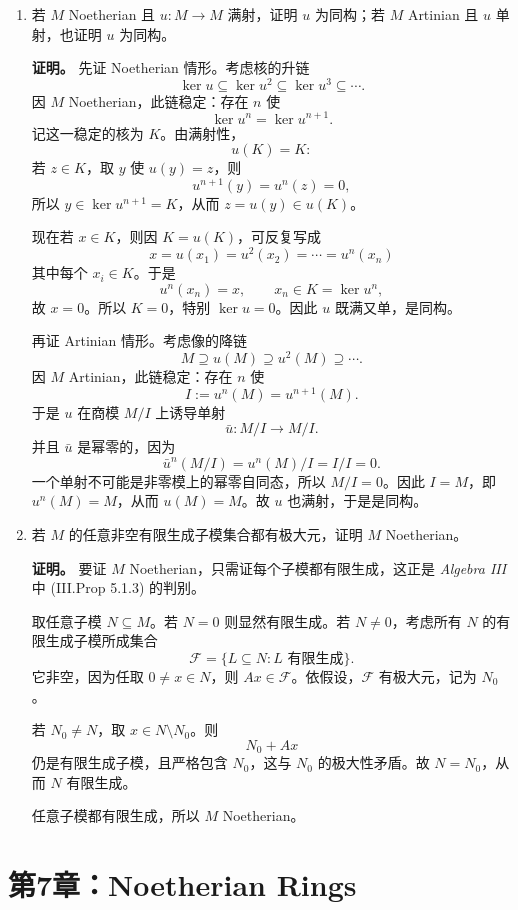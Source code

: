 \documentclass[a4paper]{ctexart}
\begin{document}
\begin{enumerate}[leftmargin=*, label=\textbf{6.\arabic*.}]
\item 若 \(M\) Noetherian 且 \(u:M\to M\) 满射，证明 \(u\) 为同构；若 \(M\) Artinian 且 \(u\) 单射，也证明 \(u\) 为同构。

\textbf{证明。}
先证 Noetherian 情形。考虑核的升链
\[
\ker u\subseteq \ker u^2\subseteq \ker u^3\subseteq \cdots.
\]
因 \(M\) Noetherian，此链稳定：存在 \(n\) 使
\[
\ker u^n=\ker u^{n+1}.
\]
记这一稳定的核为 \(K\)。由满射性，
\[
u(K)=K:
\]
若 \(z\in K\)，取 \(y\) 使 \(u(y)=z\)，则
\[
u^{n+1}(y)=u^n(z)=0,
\]
所以 \(y\in \ker u^{n+1}=K\)，从而 \(z=u(y)\in u(K)\)。

现在若 \(x\in K\)，则因 \(K=u(K)\)，可反复写成
\[
x=u(x_1)=u^2(x_2)=\cdots=u^n(x_n)
\]
其中每个 \(x_i\in K\)。于是
\[
u^n(x_n)=x,\qquad x_n\in K=\ker u^n,
\]
故 \(x=0\)。所以 \(K=0\)，特别 \(\ker u=0\)。因此 \(u\) 既满又单，是同构。

再证 Artinian 情形。考虑像的降链
\[
M\supseteq u(M)\supseteq u^2(M)\supseteq \cdots.
\]
因 \(M\) Artinian，此链稳定：存在 \(n\) 使
\[
I:=u^n(M)=u^{n+1}(M).
\]
于是 \(u\) 在商模 \(M/I\) 上诱导单射
\[
\bar u:M/I\to M/I.
\]
并且 \(\bar u\) 是幂零的，因为
\[
\bar u^n(M/I)=u^n(M)/I=I/I=0.
\]
一个单射不可能是非零模上的幂零自同态，所以 \(M/I=0\)。因此 \(I=M\)，即 \(u^n(M)=M\)，从而 \(u(M)=M\)。故 \(u\) 也满射，于是是同构。

\item 若 \(M\) 的任意非空有限生成子模集合都有极大元，证明 \(M\) Noetherian。

\textbf{证明。}
要证 \(M\) Noetherian，只需证每个子模都有限生成，这正是 \textit{Algebra III} 中 (III.Prop 5.1.3) 的判别。

取任意子模 \(N\subseteq M\)。若 \(N=0\) 则显然有限生成。若 \(N\neq 0\)，考虑所有 \(N\) 的有限生成子模所成集合
\[
\mathcal F=\{L\subseteq N: L \text{ 有限生成}\}.
\]
它非空，因为任取 \(0\neq x\in N\)，则 \(Ax\in\mathcal F\)。依假设，\(\mathcal F\) 有极大元，记为 \(N_0\)。

若 \(N_0\neq N\)，取 \(x\in N\setminus N_0\)。则
\[
N_0+Ax
\]
仍是有限生成子模，且严格包含 \(N_0\)，这与 \(N_0\) 的极大性矛盾。故 \(N=N_0\)，从而 \(N\) 有限生成。

任意子模都有限生成，所以 \(M\) Noetherian。
\end{enumerate}

\section{第7章：Noetherian Rings}
\end{document}
